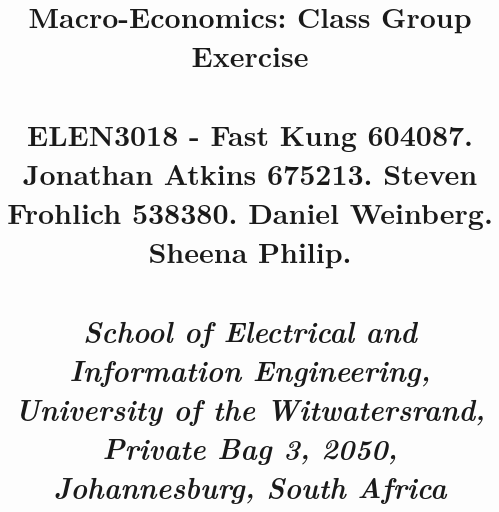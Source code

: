 \title{Macro-Economics:  Class Group Exercise \\
	\\ELEN3018 - Fast Kung 604087. Jonathan Atkins 675213. Steven Frohlich 538380. Daniel Weinberg. Sheena Philip.
	\\ \\ \tiny{\textit{School of Electrical and Information Engineering, University of the Witwatersrand, Private Bag 3, 2050, Johannesburg, South Africa}}}